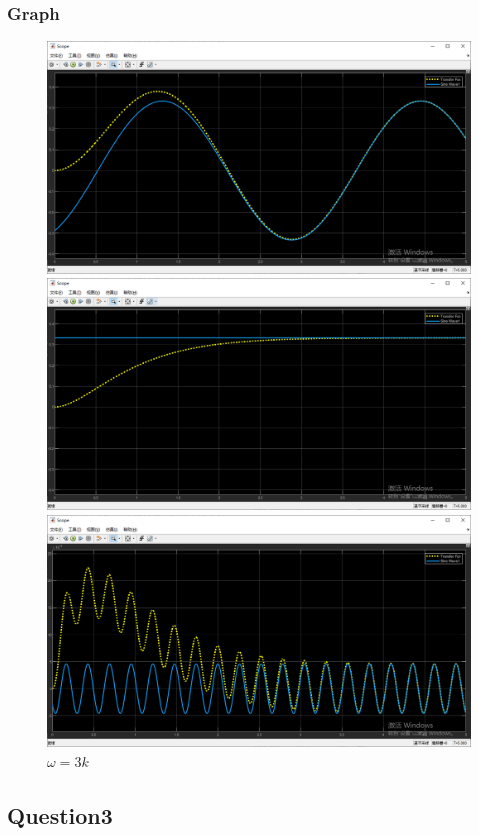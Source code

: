 \documentclass[12pt,a4paper,oneside]{ctexart}
\begin{document}
        \subsubsection{Graph}
            \begin{figure}[H]
                \includegraphics[width = 0.9\linewidth]{Q2Omega_eq2}
                \caption{ $\omega = 2 $}
                \includegraphics[width = 0.9\linewidth]{Q2Omega_eq0}
                \caption{ $\omega = 0 $}
                \includegraphics[width = 0.9\linewidth]{Q2Omega_eq3k}
                \caption{ $\omega = 3k $ }
            \end{figure}
    \subsection{Question3}
\end{document}
